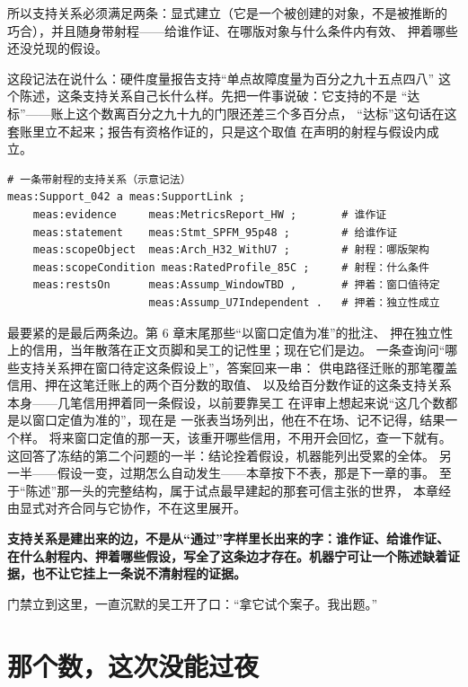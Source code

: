 所以支持关系必须满足两条：显式建立（它是一个被创建的对象，不是被推断的
巧合），并且随身带射程——给谁作证、在哪版对象与什么条件内有效、
押着哪些还没兑现的假设。

这段记法在说什么：硬件度量报告支持“单点故障度量为百分之九十五点四八”
这个陈述，这条支持关系自己长什么样。先把一件事说破：它支持的不是
“达标”——账上这个数离百分之九十九的门限还差三个多百分点，
“达标”这句话在这套账里立不起来；报告有资格作证的，只是这个取值
在声明的射程与假设内成立。

\nopagebreak[4]
\begin{codebox}
\begin{Verbatim}[fontsize=\small,breaklines=true,breakanywhere=true,breaksymbolleft={},breaksymbolright={}]
# 一条带射程的支持关系（示意记法）
meas:Support_042 a meas:SupportLink ;
    meas:evidence     meas:MetricsReport_HW ;       # 谁作证
    meas:statement    meas:Stmt_SPFM_95p48 ;        # 给谁作证
    meas:scopeObject  meas:Arch_H32_WithU7 ;        # 射程：哪版架构
    meas:scopeCondition meas:RatedProfile_85C ;     # 射程：什么条件
    meas:restsOn      meas:Assump_WindowTBD ,       # 押着：窗口值待定
                      meas:Assump_U7Independent .   # 押着：独立性成立
\end{Verbatim}
\end{codebox}

最要紧的是最后两条边。第 6 章末尾那些“以窗口定值为准”的批注、
押在独立性上的信用，当年散落在正文页脚和吴工的记性里；现在它们是边。
一条查询问“哪些支持关系押在窗口待定这条假设上”，答案回来一串：
供电路径迁账的那笔覆盖信用、押在这笔迁账上的两个百分数的取值、
以及给百分数作证的这条支持关系本身——几笔信用押着同一条假设，以前要靠吴工
在评审上想起来说“这几个数都是以窗口定值为准的”，现在是
一张表当场列出，他在不在场、记不记得，结果一个样。
将来窗口定值的那一天，该重开哪些信用，不用开会回忆，查一下就有。
这回答了冻结的第二个问题的一半：结论拴着假设，机器能列出受累的全体。
另一半——假设一变，过期怎么自动发生——本章按下不表，那是下一章的事。
至于“陈述”那一头的完整结构，属于试点最早建起的那套可信主张的世界，
本章经由显式对齐合同与它协作，不在这里展开。

\textbf{支持关系是建出来的边，不是从“通过”字样里长出来的字：谁作证、给谁作证、在什么射程内、押着哪些假设，写全了这条边才存在。机器宁可让一个陈述缺着证据，也不让它挂上一条说不清射程的证据。}

门禁立到这里，一直沉默的吴工开了口：“拿它试个案子。我出题。”

\section{那个数，这次没能过夜}

